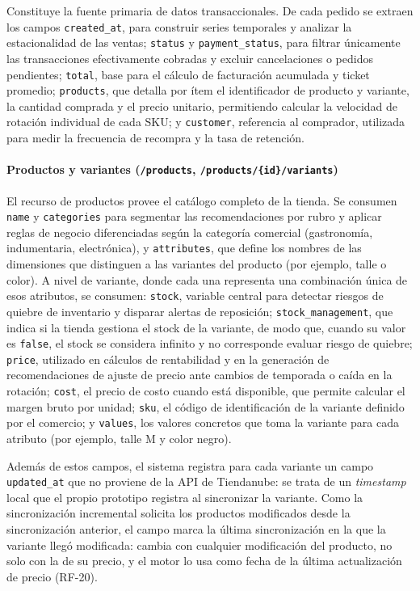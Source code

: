 Constituye la fuente primaria de datos transaccionales. De cada pedido se extraen los campos \texttt{created\_at}, para construir series temporales y analizar la estacionalidad de las ventas; \texttt{status} y \texttt{payment\_status}, para filtrar únicamente las transacciones efectivamente cobradas y excluir cancelaciones o pedidos pendientes; \texttt{total}, base para el cálculo de facturación acumulada y ticket promedio; \texttt{products}, que detalla por ítem el identificador de producto y variante, la cantidad comprada y el precio unitario, permitiendo calcular la velocidad de rotación individual de cada SKU; y \texttt{customer}, referencia al comprador, utilizada para medir la frecuencia de recompra y la tasa de retención.

\paragraph{Productos y variantes (\texttt{/products}, \texttt{/products/\{id\}/variants})}

El recurso de productos provee el catálogo completo de la tienda. Se consumen \texttt{name} y \texttt{categories} para segmentar las recomendaciones por rubro y aplicar reglas de negocio diferenciadas según la categoría comercial (gastronomía, indumentaria, electrónica), y \texttt{attributes}, que define los nombres de las dimensiones que distinguen a las variantes del producto (por ejemplo, talle o color). A nivel de variante, donde cada una representa una combinación única de esos atributos, se consumen: \texttt{stock}, variable central para detectar riesgos de quiebre de inventario y disparar alertas de reposición; \texttt{stock\_management}, que indica si la tienda gestiona el stock de la variante, de modo que, cuando su valor es \texttt{false}, el stock se considera infinito y no corresponde evaluar riesgo de quiebre; \texttt{price}, utilizado en cálculos de rentabilidad y en la generación de recomendaciones de ajuste de precio ante cambios de temporada o caída en la rotación; \texttt{cost}, el precio de costo cuando está disponible, que permite calcular el margen bruto por unidad; \texttt{sku}, el código de identificación de la variante definido por el comercio; y \texttt{values}, los valores concretos que toma la variante para cada atributo (por ejemplo, talle M y color negro).

Además de estos campos, el sistema registra para cada variante un campo \texttt{updated\_at} que no proviene de la API de Tiendanube: se trata de un \emph{timestamp} local que el propio prototipo registra al sincronizar la variante. Como la sincronización incremental solicita los productos modificados desde la sincronización anterior, el campo marca la última sincronización en la que la variante llegó modificada: cambia con cualquier modificación del producto, no solo con la de su precio, y el motor lo usa como fecha de la última actualización de precio (RF-20).

